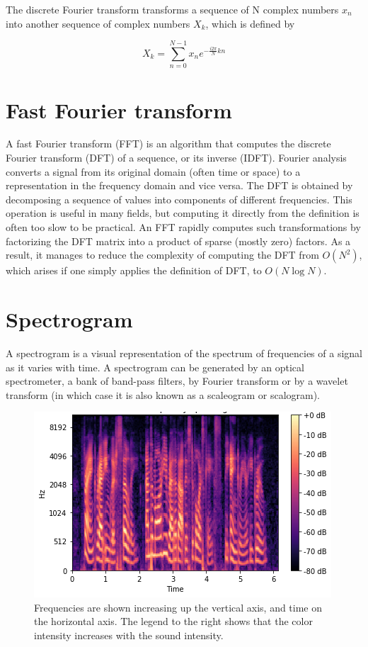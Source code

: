 \documentclass[journal,compsoc]{IEEEtran}
\begin{document}
The discrete Fourier transform transforms a sequence of N complex numbers $x_n$ into another sequence of complex numbers $X_k$, which is defined by

\[X_k = \sum_{n=0}^{N-1}x_ne^{-\frac{i2\pi}{N}kn}\]

\section{Fast Fourier transform}
A fast Fourier transform (FFT) is an algorithm that computes the discrete Fourier transform (DFT) of a sequence, or its inverse (IDFT). Fourier analysis converts a signal from its original domain (often time or space) to a representation in the frequency domain and vice versa. The DFT is obtained by decomposing a sequence of values into components of different frequencies. This operation is useful in many fields, but computing it directly from the definition is often too slow to be practical. An FFT rapidly computes such transformations by factorizing the DFT matrix into a product of sparse (mostly zero) factors. As a result, it manages to reduce the complexity of computing the DFT from $ O(N^2) $, which arises if one simply applies the definition of DFT, to $ O(N\log{N}) $.


\section{Spectrogram}
A spectrogram is a visual representation of the spectrum of frequencies of a signal as it varies with time. A spectrogram can be generated by an optical spectrometer, a bank of band-pass filters, by Fourier transform or by a wavelet transform (in which case it is also known as a scaleogram or scalogram).

\begin{figure}[H]
\begin{center}
\includegraphics[scale=0.5]{spectrogram}
		\caption{Frequencies are shown increasing up the vertical axis, and time on the horizontal axis. The legend to the right shows that the color intensity increases with the sound intensity.}
\end{center}
\end{figure}
\end{document}
